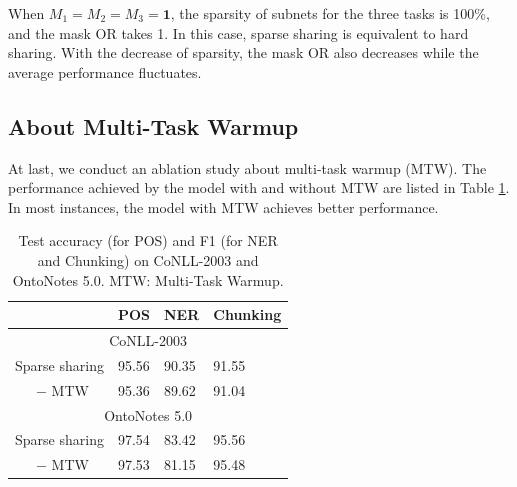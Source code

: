 \documentclass[letterpaper]{article} %
\begin{document}
When $M_1=M_2=M_3=\mathbf{1}$, the sparsity of subnets for the three tasks is 100\%, and the mask OR takes 1. In this case, sparse sharing is equivalent to hard sharing. With the decrease of sparsity, the mask OR also decreases while the average performance fluctuates.

\subsection{About Multi-Task Warmup}
At last, we conduct an ablation study about multi-task warmup (MTW). The performance achieved by the model with and without MTW are listed in Table \ref{tb:warmup}. In most instances, the model with MTW achieves better performance.

\begin{table}[htb]
\centering
\begin{tabular}{llll}
\toprule
& POS & NER & Chunking \\ \midrule
\multicolumn{4}{c}{CoNLL-2003} \\ \midrule
Sparse sharing & 95.56 & 90.35 & 91.55 \\
\ \ \ $-$ MTW & 95.36 & 89.62 & 91.04 \\ \midrule
\multicolumn{4}{c}{OntoNotes 5.0} \\ \midrule
Sparse sharing & 97.54 & 83.42 & 95.56 \\
\ \ \ $-$ MTW & 97.53 & 81.15 & 95.48 \\ \bottomrule
\end{tabular}
\caption{Test accuracy (for POS) and F1 (for NER and Chunking) on CoNLL-2003 and OntoNotes 5.0. MTW: Multi-Task Warmup.}
\label{tb:warmup}
\end{table}

\vspace{-1.73mm}
\vspace{-4.54mm}
\end{document}

